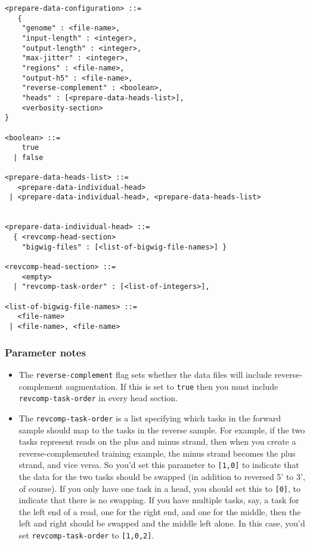 \documentclass{article}
\begin{document}
\begin{lstlisting}
<prepare-data-configuration> ::=
   {
    "genome" : <file-name>,
    "input-length" : <integer>,
    "output-length" : <integer>,
    "max-jitter" : <integer>,
    "regions" : <file-name>,
    "output-h5" : <file-name>,
    "reverse-complement" : <boolean>,
    "heads" : [<prepare-data-heads-list>],
    <verbosity-section>
}

<boolean> ::=
    true
  | false

<prepare-data-heads-list> ::=
   <prepare-data-individual-head>
 | <prepare-data-individual-head>, <prepare-data-heads-list>


<prepare-data-individual-head> ::=
  { <revcomp-head-section>
    "bigwig-files" : [<list-of-bigwig-file-names>] }

<revcomp-head-section> ::= 
    <empty>
  | "revcomp-task-order" : [<list-of-integers>],

<list-of-bigwig-file-names> ::= 
   <file-name>
 | <file-name>, <file-name>

\end{lstlisting}

\subsubsection{Parameter notes}
\begin{itemize}
    \item The \texttt{reverse-complement} flag sets whether the data files will include reverse-complement augmentation. If this is set to \texttt{true} then you must include \texttt{revcomp-task-order} in every head section.
    \item The \texttt{revcomp-task-order} is a list specifying which tasks in the forward sample should map to the tasks in the reverse sample. For example, if the two tasks represent reads on the plus and minus strand, then when you create a reverse-complemented training example, the minus strand becomes the plus strand, and vice versa. So you'd set this parameter to \texttt{[1,0]} to indicate that the data for the two tasks should be swapped (in addition to reversed 5' to 3', of course). If you only have one task in a head, you should set this to \texttt{[0]}, to indicate that there is no swapping. If you have multiple tasks, say, a task for the left end of a read, one for the right end, and one for the middle, then the left and right should be swapped and the middle left alone. In this case, you'd set \texttt{revcomp-task-order} to \texttt{[1,0,2]}. 
\end{itemize}
\end{document}
